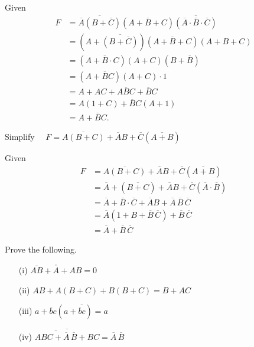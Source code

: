 \begin{solution}
Given
\begin{align*}
F &= \overline{\overline{A}(B+\overline{C})}(A+\overline{B}+C)\overline{(\overline{A}\cdot \overline{B}\cdot \overline{C})}\\[3pt]
&= (A+\overline{(B+\overline{C})})(A+\overline{B}+C)(A+B+C)\\[3pt]
&= (A+\overline{B}\cdot C)(A+C)(B+\overline{B})\\[3pt]
&= (A+\overline{B}C)(A+C)\cdot 1\\[3pt]
&= A+AC+A\overline{B}C+\overline{B}C\\[3pt]
&= A(1+C)+\overline{B}C(A+1)\\[3pt]
&= A+\overline{B}C.
\end{align*}
\end{solution}

\begin{problem}\label{prob5.66}
Simplify~~ $F=\overline{A(B+C)}+\overline{A}B+\overline{C}(\overline{A+B})$
\end{problem}

\begin{solution}
Given
\begin{align*}
F &= \overline{A(B+C)}+\overline{A}B+\overline{C}(\overline{A+B})\\[3pt]
  &= \overline{A}+(\overline{B+C})+\overline{A}B+\overline{C}(\overline{A}\cdot \overline{B})\\[3pt]
  &= \overline{A}+\overline{B}\cdot \overline{C}+\overline{A}B+\overline{A}\,\overline{B}\,\overline{C}\\[3pt]
  &= \overline{A}(1+B+\overline{B}\,\overline{C})+\overline{B}\,\overline{C}\\[3pt]
  &= \overline{A}+\overline{B}\,\overline{C}
\end{align*}
\end{solution}

\begin{problem}\label{prob5.67}
Prove the following.
\begin{itemize}
\item[(i)] $\overline{\overline{AB}+\overline{A}+AB}=0$

\item[(ii)] $AB+A(B+C)+B(B+C)=B+AC$

\item[(iii)] $a+\overline{b}c(a+\overline{\overline{b}c})=a$

\item[(iv)] $\overline{\overline{ABC+\overline{A}\,\overline{B}}+BC}=\overline{A}\,\overline{B}$
\end{itemize}
\end{problem}

